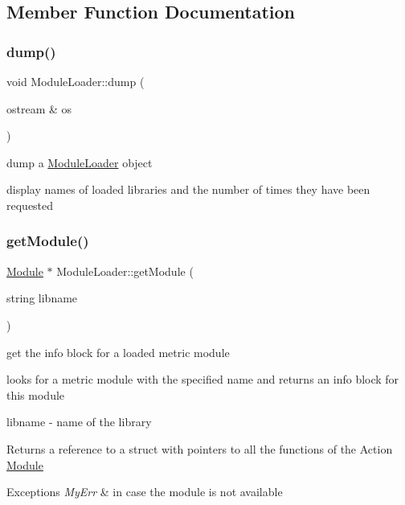 \subsection{Member Function Documentation}
\mbox{\label{classModuleLoader_a863d9c602af7d21714d0096c57780af7}} 
\subsubsection{\texorpdfstring{dump()}{dump()}}
{\footnotesize\ttfamily void Module\+Loader\+::dump (\begin{DoxyParamCaption}\item[{ostream \&}]{os }\end{DoxyParamCaption})}



dump a \hyperlink{classModuleLoader}{Module\+Loader} object 

display names of loaded libraries and the number of times they have been requested \mbox{\label{classModuleLoader_ac39cac913d2201252c2501664c9926f7}} 
\subsubsection{\texorpdfstring{get\+Module()}{getModule()}}
{\footnotesize\ttfamily \hyperlink{classModule}{Module} $\ast$ Module\+Loader\+::get\+Module (\begin{DoxyParamCaption}\item[{string}]{libname }\end{DoxyParamCaption})}



get the info block for a loaded metric module 

looks for a metric module with the specified name and returns an info block for this module

\begin{DoxyItemize}
\item {\ttfamily libname} -\/ name of the library \begin{DoxyReturn}{Returns}
a reference to a struct with pointers to all the functions of the Action \hyperlink{classModule}{Module} 
\end{DoxyReturn}

\begin{DoxyExceptions}{Exceptions}
{\em My\+Err} & in case the module is not available \\
\hline
\end{DoxyExceptions}
\end{DoxyItemize}
\mbox{\label{classModuleLoader_ac9828e3ed8c3ffa0b6bfb54dc43d5be3}} 
